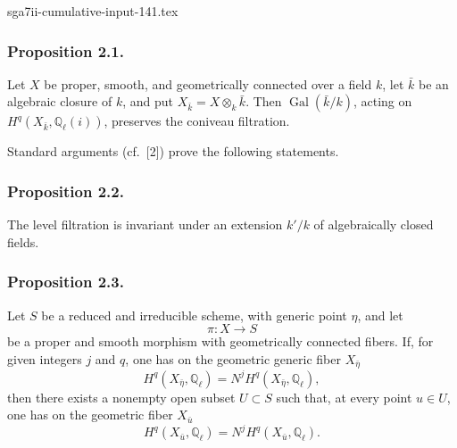 \begin{filecontents*}{sga7ii-cumulative-input-141.tex}
\subsubsection*{Proposition 2.1.}
Let $X$ be proper, smooth, and geometrically connected over a field $k$, let
$\bar k$ be an algebraic closure of $k$, and put
$X_{\bar k}=X\otimes_k\bar k$.  Then $\operatorname{Gal}(\bar k/k)$,
acting on $H^q(X_{\bar k},\mathbb Q_\ell(i))$, preserves the coniveau
filtration.

Standard arguments (cf.~[2]) prove the following statements.

\subsubsection*{Proposition 2.2.}
The level filtration is invariant under an extension $k'/k$ of
algebraically closed fields.

\subsubsection*{Proposition 2.3.}
Let $S$ be a reduced and irreducible scheme, with generic point $\eta$, and
let
\begin{equation*}
\pi:X\longrightarrow S
\end{equation*}
be a proper and smooth morphism with geometrically connected fibers.  If,
for given integers $j$ and $q$, one has on the geometric generic fiber
$X_{\bar\eta}$
\begin{equation}\tag{2.3.1}
H^q(X_{\bar\eta},\mathbb Q_\ell)
=N^jH^q(X_{\bar\eta},\mathbb Q_\ell),
\end{equation}
then there exists a nonempty open subset $U\subset S$ such that, at every
point $u\in U$, one has on the geometric fiber $X_{\bar u}$
\begin{equation}\tag{2.3.2}
H^q(X_{\bar u},\mathbb Q_\ell)
=N^jH^q(X_{\bar u},\mathbb Q_\ell).
\end{equation}

\end{filecontents*}
